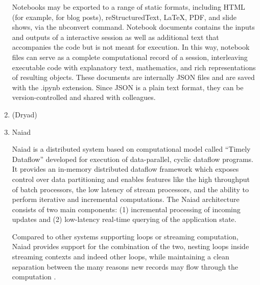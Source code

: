 \begin{enumerate}
Notebooks may be exported to a range of static formats, including
HTML (for example, for blog posts), reStructuredText, LaTeX, PDF,
and slide shows, via the nbconvert command. \label{\detokenize{i524/technologies:id27}}{\hyperref[\detokenize{i524/technologies:www-jupyter-3}]{\sphinxcrossref{{[}25{]}}}}
Notebook documents contains the inputs and outputs of a
interactive session as well as additional text that accompanies
the code but is not meant for execution. \label{\detokenize{i524/technologies:id28}}{\hyperref[\detokenize{i524/technologies:www-jupyter-4}]{\sphinxcrossref{{[}26{]}}}} In
this way, notebook files can serve as a complete computational
record of a session, interleaving executable code with explanatory
text, mathematics, and rich representations of resulting
objects. \label{\detokenize{i524/technologies:id29}}{\hyperref[\detokenize{i524/technologies:www-jupyter-5}]{\sphinxcrossref{{[}27{]}}}} These documents are internally JSON
files and are saved with the .ipynb extension. Since JSON is a
plain text format, they can be version-controlled and shared with
colleagues. \label{\detokenize{i524/technologies:id30}}{\hyperref[\detokenize{i524/technologies:www-jupyter-6}]{\sphinxcrossref{{[}28{]}}}}

\item {} 
(Dryad)

\item {} 
Naiad

Naiad \label{\detokenize{i524/technologies:id31}}{\hyperref[\detokenize{i524/technologies:paper-naiad}]{\sphinxcrossref{{[}29{]}}}} is a distributed system based on
computational model called ``Timely Dataflow'' developed for
execution of data-parallel, cyclic dataflow programs. It provides
an in-memory distributed dataflow framework which exposes control
over data partitioning and enables features like the high
throughput of batch processors, the low latency of stream
processors, and the ability to perform iterative and incremental
computations. The Naiad architecture consists of two main
components: (1) incremental processing of incoming updates and (2)
low-latency real-time querying of the application state.

Compared to other systems supporting loops or streaming
computation, Naiad provides support for the combination of the
two, nesting loops inside streaming contexts and indeed other
loops, while maintaining a clean separation between the many
reasons new records may flow through the computation
\label{\detokenize{i524/technologies:id32}}{\hyperref[\detokenize{i524/technologies:www-naiad}]{\sphinxcrossref{{[}30{]}}}}.


\end{enumerate}
